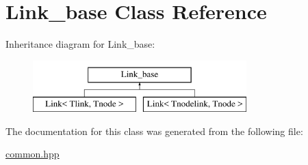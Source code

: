 \hypertarget{classLink__base}{\section{Link\+\_\+base Class Reference}
\label{classLink__base}
}
Inheritance diagram for Link\+\_\+base\+:\begin{figure}[H]
\begin{center}
\leavevmode
\includegraphics[height=2.000000cm]{classLink__base}
\end{center}
\end{figure}


The documentation for this class was generated from the following file\+:\begin{DoxyCompactItemize}
\item 
\hyperlink{common_8hpp}{common.\+hpp}\end{DoxyCompactItemize}
